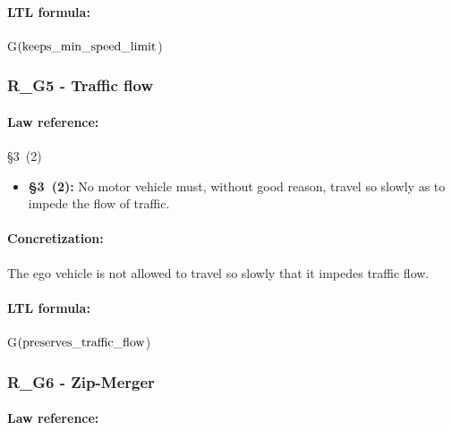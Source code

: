 \paragraph{LTL formula:} G$(\operatorname*{keeps\_min\_speed\_limit}$)

\subsubsection{R\_G5 - Traffic flow}
\paragraph{Law reference:} \stvo \S 3~(2)
\begin{itemize}
	\item \textbf{\stvo \S 3~(2):} No motor vehicle must, without good reason, travel so slowly as to impede the flow of traffic.
\end{itemize}
\paragraph{Concretization:} The ego vehicle is not allowed to travel so slowly that it impedes traffic flow.
\paragraph{LTL formula:} G$(\operatorname*{preserves\_traffic\_flow}$)

\subsubsection{R\_G6 - Zip-Merger}
\paragraph{Law reference:}

